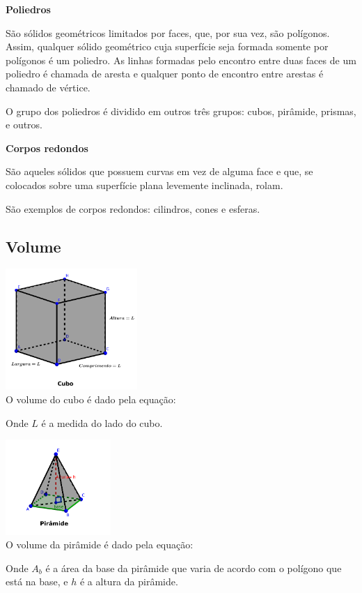  \textbf{Poliedros}

 São sólidos geométricos limitados por faces, que, por sua vez, são polígonos. Assim, qualquer sólido geométrico cuja superfície seja formada somente por polígonos é um poliedro. As linhas formadas pelo encontro entre duas faces de um poliedro é chamada de aresta e qualquer ponto de encontro entre arestas é chamado de vértice.

O grupo dos poliedros é dividido em outros três grupos: cubos, pirâmide, prismas, e outros.

\textbf{Corpos redondos}

São aqueles sólidos que possuem curvas em vez de alguma face e que, se colocados sobre uma superfície plana levemente inclinada, rolam.

São exemplos de corpos redondos: cilindros, cones e esferas.

% 
\subsection{Volume}

\begin{multicols}{2}
 \includegraphics[width=5cm]{./cap_geometria/figs/cubo} \\

 O volume do cubo é dado pela equação:
 
 
 Onde $L$ é a medida do lado do cubo.
\end{multicols}

\begin{multicols}{2}
 \includegraphics[width=4cm]{./cap_geometria/figs/piramide_quadrada} \\
 O volume da pirâmide é dado pela equação:
 
 
 Onde $A_b$ é a área da base da pirâmide que varia de acordo com o polígono que está na base, e $h$ é a altura da pirâmide.
\end{multicols}

